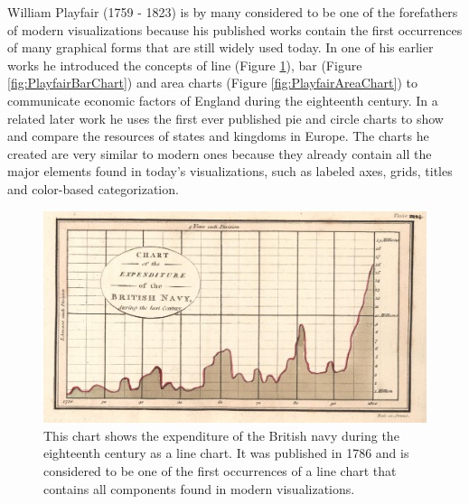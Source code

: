 William Playfair (1759 - 1823) is by many considered to be one of the forefathers of modern visualizations because his published works contain the first occurrences of many graphical forms that are still widely used today. In one of his earlier works \parencite{CommercialAndPoliticalAtlas} he introduced the concepts of line (Figure \ref{fig:PlayfairLineChart}), bar (Figure \ref{fig:PlayfairBarChart}) and area charts (Figure \ref{fig:PlayfairAreaChart}) to communicate economic factors of England during the eighteenth century. In a related later work \parencite{StatisticalBreviary} he uses the first ever published pie and circle charts to show and compare the resources of states and kingdoms in Europe. The charts he created are very similar to modern ones because they already contain all the major elements found in today's visualizations, such as labeled axes, grids, titles and color-based categorization.

\begin{figure}[tp]
    \centering
    \includegraphics[keepaspectratio,width=\linewidth,height=\fullh / 3]
    {images/playfair-line-chart.png}
    \caption[Line Chart by William Playfair From 1786]{
        This chart shows the expenditure of the British navy during the eighteenth century as a line chart. It was published in 1786 and is considered to be one of the first occurrences of a line chart that contains all components found in modern visualizations. 
    }
    \label{fig:PlayfairLineChart}
\end{figure}

